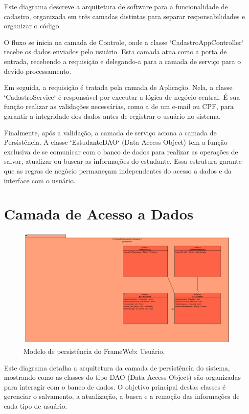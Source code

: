 Este diagrama descreve a arquitetura de software para a funcionalidade de cadastro, organizada em três camadas distintas para separar responsabilidades e organizar o código.

O fluxo se inicia na camada de Controle, onde a classe `CadastroAppController` recebe os dados enviados pelo usuário. Esta camada atua como a porta de entrada, recebendo a requisição e delegando-a para a camada de serviço para o devido processamento.

Em seguida, a requisição é tratada pela camada de Aplicação. Nela, a classe `CadastroService` é responsável por executar a lógica de negócio central. É sua função realizar as validações necessárias, como a de um e-mail ou CPF, para garantir a integridade dos dados antes de registrar o usuário no sistema.

Finalmente, após a validação, a camada de serviço aciona a camada de Persistência. A classe `EstudanteDAO` (Data Access Object) tem a função exclusiva de se comunicar com o banco de dados para realizar as operações de salvar, atualizar ou buscar as informações do estudante. Essa estrutura garante que as regras de negócio permaneçam independentes do acesso a dados e da interface com o usuário.

\section{Camada de Acesso a Dados}
\label{sec-frameweb-dados}

\begin{figure}[H]
	\centering
	\includegraphics[width=1.0\textwidth]{figuras/figura_modelo_persistencia.png}
	\caption{Modelo de persistência do FrameWeb: Usuário.}
	\label{figura-persistencia}
\end{figure}

Este diagrama detalha a arquitetura da camada de persistência do sistema, mostrando como as classes do tipo DAO (Data Access Object) são organizadas para interagir com o banco de dados. O objetivo principal destas classes é gerenciar o salvamento, a atualização, a busca e a remoção das informações de cada tipo de usuário.

